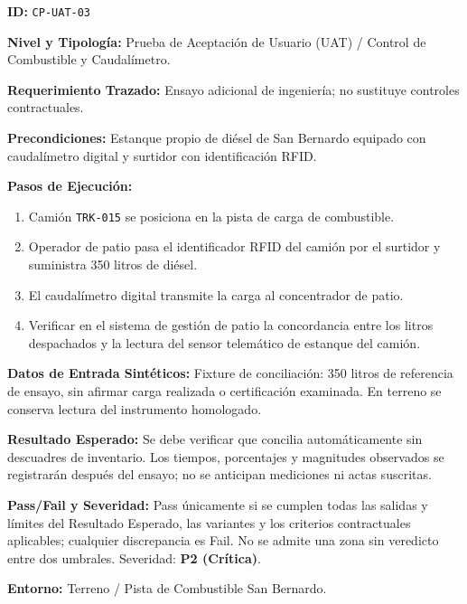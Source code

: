 \par\noindent\textbf{ID:} \texttt{C\allowbreak{}P\allowbreak{}-\allowbreak{}U\allowbreak{}A\allowbreak{}T\allowbreak{}-\allowbreak{}0\allowbreak{}3\allowbreak{}}\par
\par\noindent\textbf{Nivel y Tipología:} Prueba de Aceptación de Usuario (UAT) / Control de Combustible y Caudalímetro.\par
\par\noindent\textbf{Requerimiento Trazado:} Ensayo adicional de ingeniería; no sustituye controles contractuales.\par
\par\noindent\textbf{Precondiciones:} Estanque propio de diésel de San Bernardo equipado con caudalímetro digital y surtidor con identificación RFID.\par
\par\noindent\textbf{Pasos de Ejecución:} \par
\begin{enumerate}
\item Camión \texttt{T\allowbreak{}R\allowbreak{}K\allowbreak{}-\allowbreak{}0\allowbreak{}1\allowbreak{}5\allowbreak{}} se posiciona en la pista de carga de combustible.
\item Operador de patio pasa el identificador RFID del camión por el surtidor y suministra 350 litros de diésel.
\item El caudalímetro digital transmite la carga al concentrador de patio.
\item Verificar en el sistema de gestión de patio la concordancia entre los litros despachados y la lectura del sensor telemático de estanque del camión.
\end{enumerate}
\par\noindent\textbf{Datos de Entrada Sintéticos:} Fixture de conciliación: 350 litros de referencia de ensayo, sin afirmar carga realizada o certificación examinada. En terreno se conserva lectura del instrumento homologado.\par
\par\noindent\textbf{Resultado Esperado:} Se debe verificar que concilia automáticamente sin descuadres de inventario. Los tiempos, porcentajes y magnitudes observados se registrarán después del ensayo; no se anticipan mediciones ni actas suscritas.\par
\par\noindent\textbf{Pass/Fail y Severidad:} Pass únicamente si se cumplen todas las salidas y límites del Resultado Esperado, las variantes y los criterios contractuales aplicables; cualquier discrepancia es Fail. No se admite una zona sin veredicto entre dos umbrales. Severidad: \textbf{P2 (Crítica)}.\par
\par\noindent\textbf{Entorno:} Terreno / Pista de Combustible San Bernardo.\par






